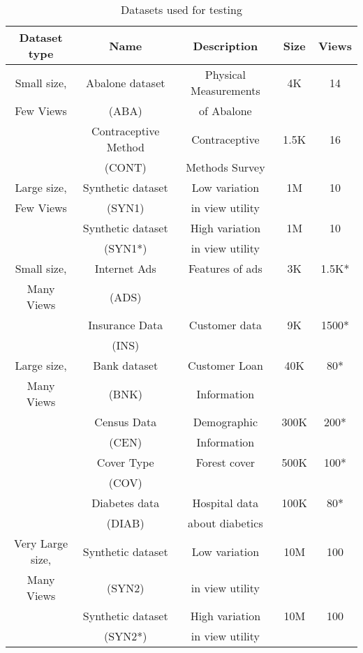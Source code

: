\begin{table}[htb]
  \centering \scriptsize
  \begin{tabular}{|c|c|c|c|c|} \hline
  Dataset type & Name & Description & Size & Views \\ \hline
  Small size, & Abalone dataset  & Physical Measurements  & 4K & 14 \\
  Few Views & (ABA) & of Abalone & & \\ \cline{2-5}
  & Contraceptive Method  & Contraceptive & 1.5K &
  16 \\
  & (CONT) & Methods Survey & & \\ \hline 
  Large size, & Synthetic dataset  & Low variation  & 1M & 10 \\
  Few Views & (SYN1) & in view utility & & \\ \cline{2-5}
  & Synthetic dataset  & High variation & 1M &
  10 \\
  & (SYN1*) & in view utility & & \\ \hline 
  Small size, & Internet Ads  & Features of ads  & 3K & 1.5K* \\
  Many Views & (ADS) & & & \\ \cline{2-5}
  & Insurance Data  & Customer data & 9K &
  1500* \\
  & (INS) & & & \\ \hline 
  Large size, & Bank dataset  & Customer Loan  & 40K & 80* \\
  Many Views & (BNK) & Information & & \\ \cline{2-5}
  & Census Data  & Demographic & 300K &
  200* \\
  & (CEN) & Information & & \\ \cline{2-5}
  & Cover Type  & Forest cover & 500K &
  100* \\
  & (COV) & & & \\ \cline{2-5}
  & Diabetes data  & Hospital data & 100K &
  80* \\
  & (DIAB) & about diabetics & &\\ \hline 
  Very Large size, & Synthetic dataset  & Low variation  & 10M & 100 \\
  Many Views & (SYN2) & in view utility & & \\ \cline{2-5}
  & Synthetic dataset  & High variation & 10M &
  100 \\
  & (SYN2*) & in view utility & & \\ \hline 
  \end{tabular}
  \caption{Datasets used for testing}
  \label{tab:datasets} 
\end{table}

